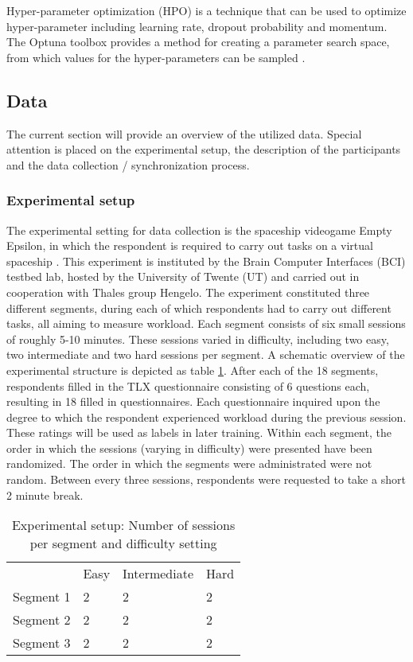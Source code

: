 \documentclass{article}
\begin{document}
Hyper-parameter optimization (HPO) is a technique that can be used to optimize hyper-parameter including learning rate, dropout probability and momentum. The Optuna toolbox provides a method for creating a parameter search space, from which values for the hyper-parameters can be sampled \cite{akiba2019optuna}. 

\subsection{Data}
The current section will provide an overview of the utilized data. Special attention is placed on the experimental setup, the description of the participants and the data collection / synchronization process. 

\subsubsection{Experimental setup}
The experimental setting for data collection is the spaceship videogame Empty Epsilon, in which the respondent is required to carry out tasks on a virtual spaceship \cite{daid2016empty}. This experiment is instituted by the Brain Computer Interfaces (BCI) testbed lab, hosted by the University of Twente (UT) and carried out in cooperation with Thales group Hengelo. The experiment constituted three different segments, during each of which respondents had to carry out different tasks, all aiming to measure workload. Each segment consists of six small sessions of roughly 5-10 minutes. These sessions varied in difficulty, including two easy, two intermediate and two hard sessions per segment. A schematic overview of the experimental structure is depicted as table \ref{table:expsetup}. After each of the 18 segments, respondents filled in the TLX questionnaire consisting of 6 questions each, resulting in 18 filled in questionnaires. Each questionnaire inquired upon the degree to which the respondent experienced workload during the previous session. These ratings will be used as labels in later training. Within each segment, the order in which the sessions (varying in difficulty) were presented have been randomized. The order in which the segments were administrated were not random. Between every three sessions, respondents were requested to take a short 2 minute break.
\bgroup
\def\arraystretch{1.6}%
\begin{table}[h]
\centering
\caption{Experimental setup: Number of sessions per segment and difficulty setting}
\label{table:expsetup}
\begin{tabular}{llll}
                               & Easy                   & Intermediate           & Hard                   \\ \cline{2-4} 
\multicolumn{1}{l|}{Segment 1} & \multicolumn{1}{l|}{2} & \multicolumn{1}{l|}{2} & \multicolumn{1}{l|}{2} \\ \cline{2-4} 
\multicolumn{1}{l|}{Segment 2} & \multicolumn{1}{l|}{2} & \multicolumn{1}{l|}{2} & \multicolumn{1}{l|}{2} \\ \cline{2-4} 
\multicolumn{1}{l|}{Segment 3} & \multicolumn{1}{l|}{2} & \multicolumn{1}{l|}{2} & \multicolumn{1}{l|}{2} \\ \cline{2-4} 
\end{tabular}
\end{table}
\end{document}

